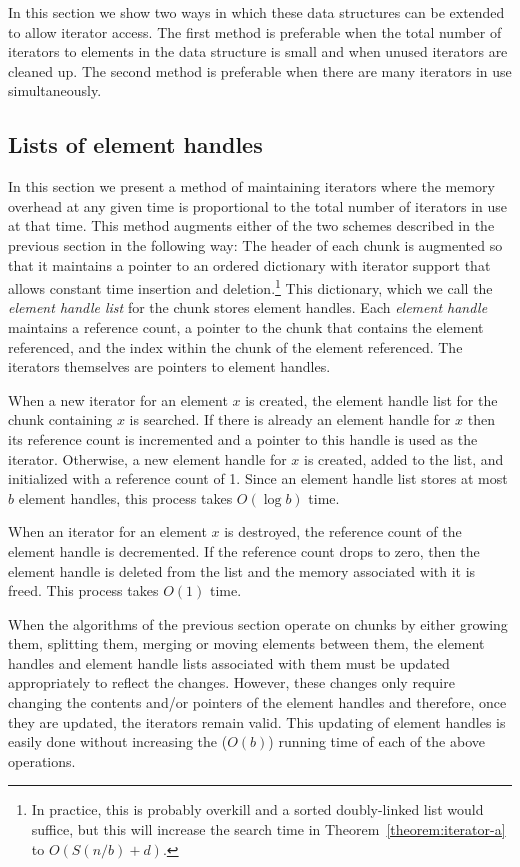 \documentclass{DIKU-article}
\newcommand{\thmref}[1]{Theorem~\ref{theorem:#1}}
\begin{document}
In this section we show two ways in which these data structures can be
extended to allow iterator access.  The first method is preferable
when the total number of iterators to elements in the data structure
is small and when unused iterators are cleaned up. The second method
is preferable when there are many iterators in use simultaneously. 

\subsection{Lists of element handles}

In this section we present a method of maintaining iterators where the
memory overhead at any given time is proportional to the total number
of iterators in use at that time.  This method augments either of the
two schemes described in the previous section in the following way:
The header of each chunk is augmented so that it maintains a pointer
to an ordered dictionary with iterator support that allows constant
time insertion and deletion.\footnote{In practice, this is probably
overkill and a sorted doubly-linked list would suffice, but this will
increase the search time in \thmref{iterator-a} to $O(S(n/b)+d)$.}
This dictionary, which we call the \emph{element handle list} for the
chunk stores element handles. Each \emph{element handle} maintains a
reference count, a pointer to the chunk that contains the element
referenced, and the index within the chunk of the element referenced.
The iterators themselves are pointers to element handles.

When a new iterator for an element $x$ is created, the element handle
list for the chunk containing $x$ is searched.  If there is already an
element handle for $x$ then its reference count is incremented and a
pointer to this handle is used as the iterator.  Otherwise, a new
element handle for $x$ is created, added to the list, and initialized
with a reference count of 1.  Since an element handle list stores at
most $b$ element handles, this process takes $O(\log b)$ time.

When an iterator for an element $x$ is destroyed, the reference count
of the element handle is decremented. If the reference count drops to
zero, then the element handle is deleted from the list and the memory
associated with it is freed.  This process takes $O(1)$ time.

When the algorithms of the previous section operate on chunks by
either growing them, splitting them, merging or moving elements
between them, the element handles and element handle lists associated
with them must be updated appropriately to reflect the changes.
However, these changes only require changing the contents and/or
pointers of the element handles and therefore, once they are updated,
the iterators remain valid.  This updating of element handles is
easily done without increasing the ($O(b)$) running time of each of
the above operations.
\end{document}
